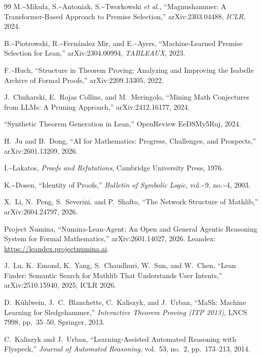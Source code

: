 \begin{thebibliography}{99}
M.\textasciitilde{}Miku{\l}a, S.\textasciitilde{}Antoniak, S.\textasciitilde{}Tworkowski \emph{et al.}, ``Magnushammer: A Transformer-Based Approach to Premise Selection,''
arXiv:2303.04488, \emph{ICLR}, 2024.

B.\textasciitilde{}Piotrowski, R.\textasciitilde{}Fern\'andez Mir, and E.\textasciitilde{}Ayers, ``Machine-Learned Premise Selection for Lean,''
arXiv:2304.00994, \emph{TABLEAUX}, 2023.

F.\textasciitilde{}Huch, ``Structure in Theorem Proving: Analyzing and Improving the Isabelle Archive of Formal Proofs,''
arXiv:2209.13305, 2022.

J.~Chuharski, E.~Rojas Collins, and M.~Meringolo,
``Mining Math Conjectures from LLMs: A Pruning Approach,''
arXiv:2412.16177, 2024.

``Synthetic Theorem Generation in Lean,''
OpenReview EeDSMy5Ruj, 2024.

H.~Ju and B.~Dong, ``AI for Mathematics: Progress, Challenges, and Prospects,''
arXiv:2601.13209, 2026.

I.\textasciitilde{}Lakatos, \emph{Proofs and Refutations}, Cambridge University Press, 1976.

K.\textasciitilde{}Dosen, ``Identity of Proofs,''
\emph{Bulletin of Symbolic Logic}, vol.\textasciitilde{}9, no.\textasciitilde{}4, 2003.

X.~Li, N.~Peng, S.~Severini, and P.~Shafto, ``The Network Structure of Mathlib,''
arXiv:2604.24797, 2026.

Project Numina, ``Numina-Lean-Agent: An Open and General Agentic Reasoning
System for Formal Mathematics,'' arXiv:2601.14027, 2026.
Leandex: \url{https://leandex.projectnumina.ai}.

J.~Lu, K.~Emond, K.~Yang, S.~Chaudhuri, W.~Sun, and W.~Chen,
``Lean Finder: Semantic Search for Mathlib That Understands User Intents,''
arXiv:2510.15940, 2025; ICLR 2026.

D.~K\"uhlwein, J.~C.~Blanchette, C.~Kaliszyk, and J.~Urban,
``MaSh: Machine Learning for Sledgehammer,''
\emph{Interactive Theorem Proving (ITP 2013)}, LNCS 7998, pp.~35--50, Springer, 2013.

C.~Kaliszyk and J.~Urban, ``Learning-Assisted Automated Reasoning with Flyspeck,''
\emph{Journal of Automated Reasoning}, vol.~53, no.~2, pp.~173--213, 2014.

\end{thebibliography}